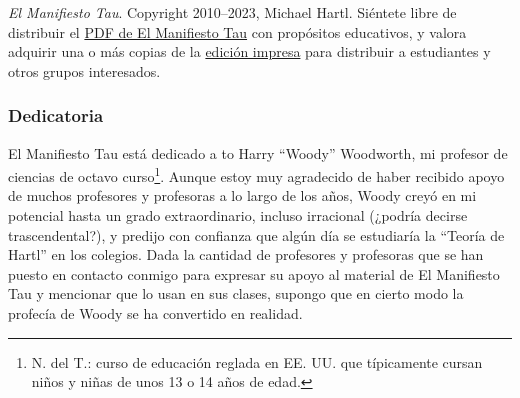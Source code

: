     \emph{El Manifiesto Tau}. Copyright 2010--2023, Michael Hartl. Siéntete libre de distribuir el \href{https://tauday.com/tau_manifesto.pdf}{PDF de El Manifiesto Tau} con propósitos educativos, y valora adquirir una o más copias de la \href{https://tauday.com/print}{edición impresa} para distribuir a estudiantes y otros grupos interesados.



\renewcommand{\thesubsubsection}{6.283185}

    \subsubsection{Dedicatoria} %
    \label{sec:dedication}

    El Manifiesto Tau está dedicado a to Harry ``Woody'' Woodworth, mi profesor de ciencias de octavo curso\footnote{N. del T.: curso de educación reglada en EE. UU. que típicamente cursan niños y niñas de unos 13 o 14 años de edad.}. Aunque estoy muy agradecido de haber recibido apoyo de muchos profesores y profesoras a lo largo de los años, Woody creyó en mi potencial hasta un grado extraordinario, incluso irracional (¿podría decirse trascendental?), y predijo con confianza que algún día se estudiaría la ``Teoría de Hartl'' en los colegios. Dada la cantidad de profesores y profesoras que se han puesto en contacto conmigo para expresar su apoyo al material de El Manifiesto Tau y mencionar que lo usan en sus clases, supongo que en cierto modo la profecía de Woody se ha convertido en realidad.

